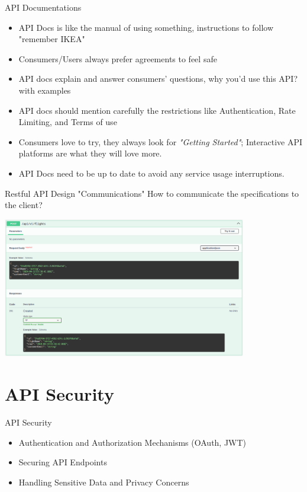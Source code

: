 \documentclass{beamer}
\begin{document}
\begin{frame}[t]{API Documentations}
		\begin{itemize}
			\item<1-> API Docs is like the manual of using something, instructions to follow "remember IKEA" 
			\item<2-> Consumers/Users always prefer agreements to feel safe
			\item<3-> API docs explain and answer consumers' questions, why you'd use this API? with examples
			\item<4-> API docs should mention carefully the restrictions like Authentication, Rate Limiting, and Terms of use
			\item<5-> Consumers love to try, they always look for \textit{"Getting Started"}; Interactive API platforms are what they will love more.
			\item<6-> API Docs need to be up to date to avoid any service usage interruptions.
		\end{itemize}		
	
\end{frame}


\begin{frame}[t]{Restful API Design "Communications"}
		\scriptsize	
		How to communicate the specifications to the client?

		\begin{center}
   			\includegraphics[width=0.8\textwidth, height=0.6\textheight]{img/swagger-doc.png}
		\end{center}		
	
\end{frame}


\section{API Security}
\begin{frame}{API Security}
  \begin{itemize}
    \item Authentication and Authorization Mechanisms (OAuth, JWT)
    \item Securing API Endpoints
    \item Handling Sensitive Data and Privacy Concerns
  \end{itemize}
\end{frame}
\end{document}
